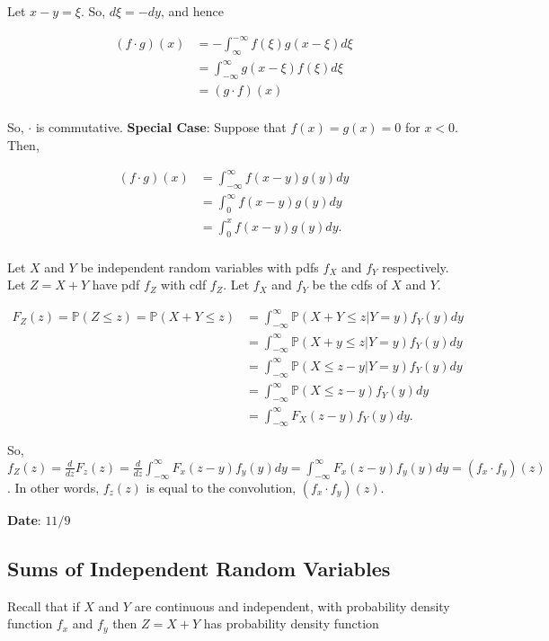 \documentclass[12pt]{article}
\newcommand{\prob}[1]{\mathbb{P}(#1)}
\newcommand{\nspace}{\vspace*{.5cm}}
\newcommand{\nline}{\nspace \noindent}
\begin{document}
\nline
Let $x-y = \xi$. So, $d \xi = -dy$, and hence

\begin{align*}
(f \cdot g)(x) &= - \int_{\infty}^{- \infty} f(\xi) g(x- \xi) d \xi \\
&= \int_{- \infty}^{\infty} g(x- \xi) f(\xi) d \xi \\
&= (g \cdot f)(x) \\
\end{align*}

\nline
So, $\cdot$ is commutative. \textbf{Special Case}: Suppose that $f(x) = g(x) = 0$ for $x < 0$. Then, 

\begin{align*}
(f \cdot g)(x) &= \int_{- \infty}^{\infty} f(x-y) g(y) dy \\
&= \int_{0}^{\infty} f(x-y) g(y) dy \\
&= \int_{0}^{x} f(x-y) g(y) dy. \\
\end{align*}

\nline
Let $X$ and $Y$ be independent random variables with pdfs $f_X$ and $f_Y$ respectively. Let $Z = X + Y$ have pdf $f_Z$ with cdf $f_Z$. Let $f_X$ and $f_Y$ be the cdfs of $X$ and $Y$. 

\begin{align*}
F_Z(z) = \prob{Z \leq z} = \prob{X + Y \leq z} &= \int_{- \infty}^{\infty} \prob{X + Y \leq z \lvert Y = y} f_Y(y) dy \\
&= \int_{- \infty}^{\infty} \prob{X + y \leq z \lvert Y = y} f_Y(y) dy \\ 
&= \int_{- \infty}^{\infty} \prob{X \leq z - y \lvert Y = y} f_Y(y) dy \\
&= \int_{- \infty}^{\infty} \prob{X \leq z - y} f_Y(y) dy \\
&= \int_{- \infty}^{\infty} F_X(z-y) f_Y(y) dy.
\end{align*}

\noindent
So, $f_Z(z) = \frac{d}{dz} F_z(z) = \frac{d}{dz} \int_{- \infty}^{\infty} F_x (z-y) f_y (y) dy =  \int_{- \infty}^{\infty} F_x (z-y) f_y (y) dy = (f_x \cdot f_y)(z)$. In other words, $f_z(z)$ is equal to the convolution, $(f_x \cdot f_y)(z)$.

\begin{flushright}
\textbf{Date}: $11/9$
\end{flushright}

\subsection*{Sums of Independent Random Variables}
\nline
Recall that if $X$ and $Y$ are continuous and independent, with probability density function $f_x$ and $f_y$ then $Z = X + Y$ has probability density function 
\end{document}
